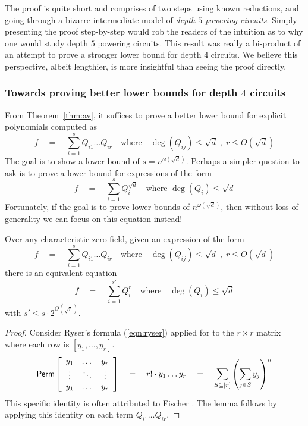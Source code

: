 \documentclass{beatcs}
\newcommand{\spaced}[1]{\quad#1\quad}
\begin{document}
The proof is quite short and comprises of two steps using known reductions, and going through a bizarre intermediate model of \emph{depth $5$ powering circuits}. Simply presenting the proof step-by-step would rob the readers of the intuition as to why one would study depth $5$ powering circuits. This result was really a bi-product of an attempt to prove a stronger lower bound for depth $4$ circuits. We believe this perspective, albeit lengthier, is more insightful than seeing the proof directly. 

\subsubsection{Towards proving better lower bounds for depth $4$ circuits}

From Theorem~\ref{thm:av}, it suffices to prove a better lower bound for explicit polynomials computed as
\begin{equation}\label{eqn:d4-LB}
f\spaced{=} \sum_{i=1}^s Q_{i1}\dots Q_{ir} \quad\text{where}\quad \deg(Q_{ij})\leq \sqrt{d}\;,\; r\leq O(\sqrt{d})
\end{equation}
The goal is to show a lower bound of $s = n^{\omega(\sqrt{d})}$. Perhaps a simpler question to ask is to prove a lower bound for expressions of the form
\begin{equation}\label{eqn:d4pow-LB}
f\spaced{=} \sum_{i=1}^s Q_{i}^{\sqrt{d}} \quad\text{where }\deg(Q_i)\leq \sqrt{d}
\end{equation}
Fortunately, if the goal is to prove lower bounds of $n^{\omega(\sqrt{d})}$, then without loss of generality we can focus on this equation instead! 

\begin{lemma}\label{lem:fischer}
Over any characteristic zero field, given an expression of the form 
\[
f\spaced{=} \sum_{i=1}^s Q_{i1}\dots Q_{ir} \quad\text{where}\quad \deg(Q_{ij})\leq \sqrt{d}\;,\; r\leq O(\sqrt{d})
\]
there is an equivalent equation
\[
f\spaced{=} \sum_{i=1}^{s'} Q_{i}^r\quad\text{where}\quad \deg(Q_{i})\leq \sqrt{d}
\]
with $s' \leq s \cdot 2^{O(\sqrt{r})}$. 
\end{lemma}
\begin{proof}
Consider Ryser's formula (\ref{eqn:ryser}) applied for to the $r\times r$ matrix where each row is $[y_1,\dots, y_r]$. 
\[
\mathsf{Perm} \left[\begin{array}{ccc} y_1 & \dots & y_r\\ \vdots & \ddots & \vdots \\ y_1 & \dots & y_r\end{array}\right] \quad = \quad r! \cdot y_1\dots y_r \quad = \quad \sum_{S\subseteq [r]} \left(\sum_{j\in S} y_j\right)^n
\]
This specific identity is often attributed to Fischer \cite{fischer}. The lemma follows by applying this identity on each term $Q_{i1}\dots Q_{ir}$. 
\end{proof}
\end{document}
